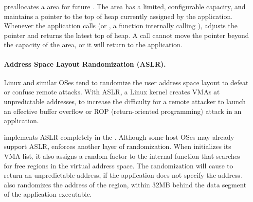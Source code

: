 \thelibos{} preallocates a  area for future  \linuxapis{}.
The  area has a limited, configurable capacity,
and maintains a  pointer to the top of heap currently assigned by the application.
Whenever the application calls  (or , a \libc{} function internally calling ),
\thelibos{} adjusts the  pointer
and returns the latest top of heap.
A  call cannot move the  pointer beyond the capacity of the  area,
or it will return  to the application.


\paragraph{Address Space Layout Randomization (ASLR).}


Linux and similar OSes tend to randomize the user address space layout to defeat or confuse remote attacks.
With ASLR, a Linux kernel creates VMAs at unpredictable addresses,
to increase the difficulty for a remote attacker to launch an effective buffer overflow or ROP (return-oriented programming) attack in an application.



\thelibos{} implements ASLR completely in the \libos{}. Although some host OSes may already support ASLR, \thelibos{} enforces another layer of randomization.
When \thelibos{} initializes its VMA list, it also assigns a random factor to the internal function that searches for free regions in the virtual address space.
The randomization will cause  to return an unpredictable address, if the application does not specify the address.
\thelibos{} also randomizes the address of the  region, within 32MB behind the data segment of the application executable.






